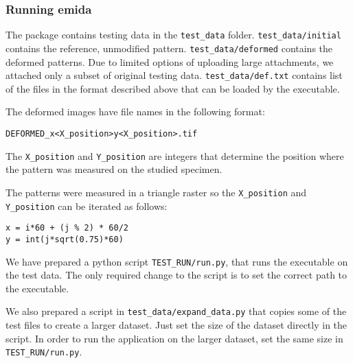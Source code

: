 \subsubsection*{Running emida}

The package contains testing data in the \texttt{test\_data} folder. \texttt{test\_data/initial} contains the reference, unmodified pattern. \texttt{test\_data/deformed} contains the deformed patterns. Due to limited options of uploading large attachments, we attached only a subset of original testing data. \texttt{test\_data/def.txt} contains list of the files in the format described above that can be loaded by the executable.

\vspace{0.3cm}
\noindent
The deformed images have file names in the following format:
\begin{verbatim}
DEFORMED_x<X_position>y<X_position>.tif
\end{verbatim}
The \texttt{X\_position} and \texttt{Y\_position} are integers that determine the position where the pattern was measured on the studied specimen.

\vspace{0.3cm}
\noindent
The patterns were measured in a triangle raster so the \texttt{X\_position} and \texttt{Y\_position} can be iterated as follows:
\begin{verbatim}
x = i*60 + (j % 2) * 60/2
y = int(j*sqrt(0.75)*60)
\end{verbatim}
We have prepared a python script \texttt{TEST\_RUN/run.py}, that runs the executable on the test data. The only required change to the script is to set the correct path to the executable.

We also prepared a script in \texttt{test\_data/expand\_data.py} that copies some of the test files to create a larger dataset. Just set the size of the dataset directly in the script. In order to run the application on the larger dataset, set the same size in \texttt{TEST\_RUN/run.py}.